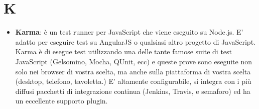 \section{K}
\begin{itemize} 
	\item
	\textbf{Karma}: è un test runner per JavaScript che viene eseguito su Node.js. E' adatto per eseguire test su AngularJS o qualsiasi altro progetto di JavaScript. Karma è di esegue test utilizzando una delle tante famose suite di test JavaScript (Gelsomino, Mocha, QUnit, ecc) e queste prove sono eseguite non solo nei browser di vostra scelta, ma anche sulla piattaforma di vostra scelta (desktop, telefono, tavoletta.) E' altamente configurabile, si integra con i più diffusi pacchetti di integrazione continua (Jenkins, Travis, e semaforo) ed ha un eccellente supporto plugin.
\end{itemize}
